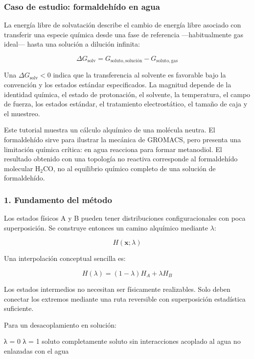 \documentclass[
  spanish,
  11pt,
  a4paper]{article}
\newenvironment{Shaded}{\begin{snugshade}}{\end{snugshade}}
\newcommand{\NormalTok}[1]{#1}
\begin{document}
\subsubsection{Caso de estudio: formaldehído en
agua}\label{caso-de-estudio-formaldehuxeddo-en-agua}

La energía libre de solvatación describe el cambio de energía libre
asociado con transferir una especie química desde una fase de referencia
---habitualmente gas ideal--- hasta una solución a dilución infinita:

\[
\Delta G_{\mathrm{solv}} =
G_{\mathrm{soluto,solución}}-
G_{\mathrm{soluto,gas}}
\]

Una \(\Delta G_{\mathrm{solv}}<0\) indica que la transferencia al
solvente es favorable bajo la convención y los estados estándar
especificados. La magnitud depende de la identidad química, el estado de
protonación, el solvente, la temperatura, el campo de fuerza, los
estados estándar, el tratamiento electrostático, el tamaño de caja y el
muestreo.

Este tutorial muestra un cálculo alquímico de una molécula neutra. El
formaldehído sirve para ilustrar la mecánica de GROMACS, pero presenta
una limitación química crítica: en agua reacciona para formar
metanodiol. El resultado obtenido con una topología no reactiva
corresponde al formaldehído molecular \(\mathrm{H_2CO}\), no al
equilibrio químico completo de una solución de formaldehído.

\subsubsection{1. Fundamento del método}\label{fundamento-del-muxe9todo}

Los estados físicos A y B pueden tener distribuciones configuracionales
con poca superposición. Se construye entonces un camino alquímico
mediante \(\lambda\):

\[
H(\mathbf{x};\lambda)
\]

Una interpolación conceptual sencilla es:

\[
H(\lambda)=(1-\lambda)H_A+\lambda H_B
\]

Los estados intermedios no necesitan ser físicamente realizables. Solo
deben conectar los extremos mediante una ruta reversible con
superposición estadística suficiente.

Para un desacoplamiento en solución:

\begin{Shaded}
\begin{Highlighting}[]
\NormalTok{λ = 0                         λ = 1}
\NormalTok{soluto completamente          soluto sin interacciones}
\NormalTok{acoplado al agua              no enlazadas con el agua}
\end{Highlighting}
\end{Shaded}
\end{document}
